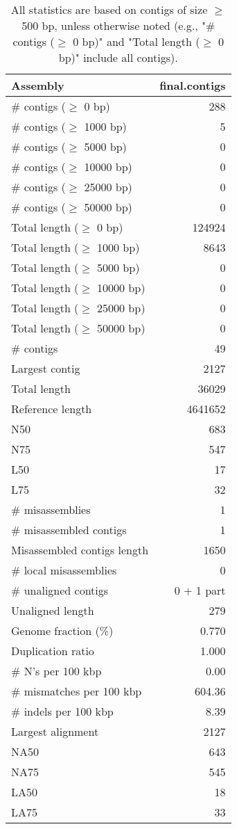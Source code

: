\documentclass[12pt,a4paper]{article}
\begin{document}
\begin{table}[ht]
\begin{center}
\caption{All statistics are based on contigs of size $\geq$ 500 bp, unless otherwise noted (e.g., "\# contigs ($\geq$ 0 bp)" and "Total length ($\geq$ 0 bp)" include all contigs).}
\begin{tabular}{|l*{1}{|r}|}
\hline
Assembly & final.contigs \\ \hline
\# contigs ($\geq$ 0 bp) & 288 \\ \hline
\# contigs ($\geq$ 1000 bp) & 5 \\ \hline
\# contigs ($\geq$ 5000 bp) & 0 \\ \hline
\# contigs ($\geq$ 10000 bp) & 0 \\ \hline
\# contigs ($\geq$ 25000 bp) & 0 \\ \hline
\# contigs ($\geq$ 50000 bp) & 0 \\ \hline
Total length ($\geq$ 0 bp) & 124924 \\ \hline
Total length ($\geq$ 1000 bp) & 8643 \\ \hline
Total length ($\geq$ 5000 bp) & 0 \\ \hline
Total length ($\geq$ 10000 bp) & 0 \\ \hline
Total length ($\geq$ 25000 bp) & 0 \\ \hline
Total length ($\geq$ 50000 bp) & 0 \\ \hline
\# contigs & 49 \\ \hline
Largest contig & 2127 \\ \hline
Total length & 36029 \\ \hline
Reference length & 4641652 \\ \hline
N50 & 683 \\ \hline
N75 & 547 \\ \hline
L50 & 17 \\ \hline
L75 & 32 \\ \hline
\# misassemblies & 1 \\ \hline
\# misassembled contigs & 1 \\ \hline
Misassembled contigs length & 1650 \\ \hline
\# local misassemblies & 0 \\ \hline
\# unaligned contigs & 0 + 1 part \\ \hline
Unaligned length & 279 \\ \hline
Genome fraction (\%) & 0.770 \\ \hline
Duplication ratio & 1.000 \\ \hline
\# N's per 100 kbp & 0.00 \\ \hline
\# mismatches per 100 kbp & 604.36 \\ \hline
\# indels per 100 kbp & 8.39 \\ \hline
Largest alignment & 2127 \\ \hline
NA50 & 643 \\ \hline
NA75 & 545 \\ \hline
LA50 & 18 \\ \hline
LA75 & 33 \\ \hline
\end{tabular}
\end{center}
\end{table}
\end{document}
